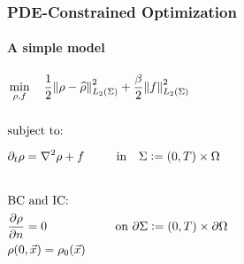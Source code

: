 \documentclass[aspectratio=169,xcolor=dvipsnames]{beamer}
\begin{document}
\begin{frame}
	\frametitle{PDE-Constrained Optimization}
	\framesubtitle{A simple model}
		\begin{align*}
		&\min_{\rho,f} \quad \frac{1}{2}\norm{\rho- \widehat{\rho}}_{L_2(\Sigma)}^2 + \frac{\beta}{2} \norm{f}_{L_2(\Sigma)}^2\\
		\\ 
		&\text{subject to:}
		\\
		& \partial_t \rho = \nabla^2 \rho + f \ \qquad \text{  in    }\ \ \Sigma := (0,T) \times \Omega  \phantom{ \nabla \cdot (\rho \vec{w})+{\nabla \cdot \int_\Omega \rho(\vec{x}) \rho(\vec{x}') \nabla V_2(|\vec{x}-\vec{x}\hspace{0.2em}'|)d\vec{x}'} }\\
		\\
		&\text{BC } \text{and IC:}\\
		&\frac{\partial \rho}{\partial n}  = 0 \quad \ \ \qquad \qquad \text{on   } \partial \Sigma := (0,T) \times \partial \Omega  \\
		&\rho(0,\vec{x}) = \rho_0(\vec{x})
		\end{align*}

\end{frame}
\end{document}
